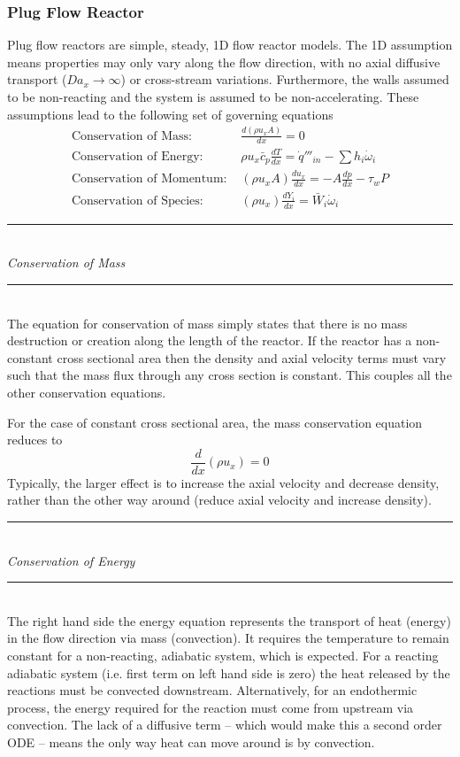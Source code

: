\documentclass[11pt]{article}
\newcommand{\Header}[1]{\noindent\rule{\textwidth}{0.4pt}\\[0.3cm]\indent \large{\textit{#1}}\normalsize{}\\[-0.1cm]\noindent\rule{\textwidth}{0.4pt}}
\begin{document}
\subsubsection{Plug Flow Reactor}
Plug flow reactors are simple, steady, 1D flow reactor models. The 1D assumption means properties may only vary along the flow direction, with no axial diffusive transport ($Da_x\to\infty$) or cross-stream variations. Furthermore, the walls assumed to be non-reacting and the system is assumed to be non-accelerating. These assumptions lead to the following set of governing equations
\begin{align*}
\textrm{Conservation of Mass: } &\frac{d(\rho u_xA)}{dx} = 0\\
\textrm{Conservation of Energy: } &\rho u_x\bar c_p \frac{dT}{dx} = \dot q'''_{in} - \sum h_i\dot\omega_i\\
\textrm{Conservation of Momentum: } &(\rho u_xA)\frac{du_x}{dx} = -A\frac{dp}{dx} - \tau_wP\\
\textrm{Conservation of Species: } &(\rho u_x)\frac{dY_i}{dx} = \bar W_i \dot\omega_i
\end{align*}

\Header{Conservation of Mass}\\

The equation for conservation of mass simply states that there is no mass destruction or creation along the length of the reactor. If the reactor has a non-constant cross sectional area then the density and axial velocity terms must vary such that the mass flux through any cross section is constant. This couples all the other conservation equations.

For the case of constant cross sectional area, the mass conservation equation reduces to
$$\frac{d}{dx}(\rho u_x) = 0$$
Typically, the larger effect is to increase the axial velocity and decrease density, rather than the other way around (reduce axial velocity and increase density).\\

\Header{Conservation of Energy}\\

The right hand side the energy equation represents the transport of heat (energy) in the flow direction via mass (convection). It requires the temperature to remain constant for a non-reacting, adiabatic system, which is expected. For a reacting adiabatic system (i.e. first term on left hand side is zero) the heat released by the reactions must be convected downstream. Alternatively, for an endothermic process, the energy required for the reaction must come from upstream via convection. The lack of a diffusive term -- which would make this a second order ODE -- means the only way heat can move around is by convection.
\end{document}
